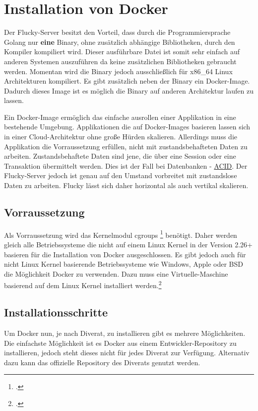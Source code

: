 \section{Installation von Docker}%
\label{sec:docker}
Der Flucky-Server besitzt den Vorteil, dass durch die Programmiersprache Golang nur \textbf{eine} Binary, ohne zusätzlich abhängige Bibliotheken, durch den Kompiler kompiliert wird. Dieser ausführbare Datei ist somit sehr einfach auf anderen Systemen auszuführen da keine zusätzlichen Bibliotheken gebraucht werden. Momentan wird die Binary jedoch ausschließlich für x86\_64 Linux Architekturen kompiliert. Es gibt zusätzlich neben der Binary ein Docker-Image. Dadurch dieses Image ist es möglich die Binary auf anderen Architektur laufen zu lassen.

Ein Docker-Image ermöglich das einfache ausrollen einer Applikation in eine bestehende Umgebung. Applikationen die auf Docker-Images basieren lassen sich in einer Cloud-Architektur ohne große Hürden skalieren. Allerdings muss die Applikation die Vorraussetzung erfüllen, nicht mit zustandsbehafteten Daten zu arbeiten. Zustandsbehaftete Daten sind jene, die über eine Session oder eine Transaktion übermittelt werden. Dies ist der Fall bei Datenbanken - \href{https://de.wikipedia.org/wiki/ACID}{ACID}. Der Flucky-Server jedoch ist genau auf den Umstand vorbreitet mit zustandslose Daten zu arbeiten. Flucky lässt sich daher horizontal als auch vertikal skalieren.

\subsection{Vorraussetzung}%
\label{sec:docker.vorraussetzung}
Als Vorraussetzung wird das Kernelmodul cgroups \footcite{cgroups} benötigt. Daher werden gleich alle Betriebssysteme die nicht auf einem Linux Kernel in der Version 2.26+ basieren für die Installation von Docker ausgeschlossen. Es gibt jedoch auch für nicht Linux Kernel basierende Betriebssysteme wie Windows, Apple oder BSD die Möglichkeit Docker zu verwenden. Dazu muss eine Virtuelle-Maschine basierend auf dem Linux Kernel installiert werden.\footcite{moby}

\subsection{Installationsschritte}%
\label{sec:docker.installation}
Um Docker nun, je nach Diverat, zu installieren gibt es mehrere Möglichkeiten. Die einfachste Möglichkeit ist es Docker aus einem Entwickler-Repository zu installieren, jedoch steht dieses nicht für jedes Diverat zur Verfügung. Alternativ dazu kann das offizielle Repository des Diverats genutzt werden.

